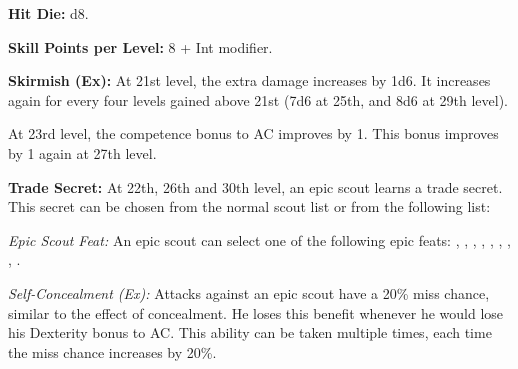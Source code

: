 
\MiniWarriorTable{The Epic Scout}{
21 & +15/+10/+5        & +7  & +12 & +7  & Skirmish ~~~~~~ (+6d6/+5 AC)\\
22 & +16/+11/+6/+1     & +7  & +13 & +7  & Trade secret\\
23 & +17/+12/+7/+2     & +7  & +13 & +7  & Skirmish ~~~~~~ (+6d6/+6 AC)\\
24 & +18/+13/+8/+3     & +8  & +14 & +8  & Bonus feat\\
25 & +18/+13/+8/+3     & +8  & +14 & +8  & Special ability, skirmish ~~~~~~ (+7d6/+6 AC)\\
26 & +19/+14/+9/+4     & +8  & +15 & +8  & Trade secret\\
27 & +20/+15/+10/+5    & +9  & +15 & +9  & Skirmish ~~~~~~ (+7d6/+7 AC)\\
28 & +21/+16/+11/+6/+1 & +9  & +16 & +9  & Bonus feat\\
29 & +21/+16/+11/+6/+1 & +9  & +16 & +9  & Skirmish ~~~~~~ (+8d6/+7 AC)\\
30 & +22/+17/+12/+7/+2 & +10 & +17 & +10 & Special ability, trade secret\\
}

\textbf{Hit Die:} d8.

\textbf{Skill Points per Level:} 8 + Int modifier.

\textbf{Skirmish (Ex):} At 21st level, the extra damage increases by 1d6. It increases again for every four levels gained above 21st (7d6 at 25th, and 8d6 at 29th level).

At 23rd level, the competence bonus to AC improves by 1. This bonus improves by 1 again at 27th level.

\textbf{Trade Secret:} At 22th, 26th and 30th level, an epic scout learns a trade secret. This secret can be chosen from the normal scout list or from the following list:

\textit{Epic Scout Feat:} An epic scout can select one of the following epic feats:
,
,
,
,
,
,
,
,
.

\textit{Self-Concealment (Ex):} Attacks against an epic scout have a 20\% miss chance, similar to the effect of concealment. He loses this benefit whenever he would lose his Dexterity bonus to AC. This ability can be taken multiple times, each time the miss chance increases by 20\%.

